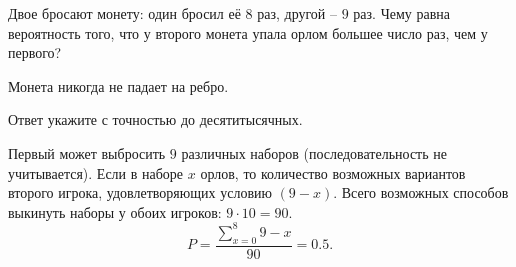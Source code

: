 
Двое бросают монету: один бросил её $8$ раз, другой – $9$ раз. Чему равна вероятность того, что у второго монета упала орлом большее число раз, чем у первого?

Монета никогда не падает на ребро.

Ответ укажите с точностью до десятитысячных.

\soultionSection

Первый может выбросить $9$ различных наборов (последовательность не учитывается). Если в наборе $x$ орлов, то количество возможных вариантов второго игрока, удовлетворяющих условию $(9 - x)$. Всего возможных способов выкинуть наборы у обоих игроков: $9 \cdot 10 = 90$. $$P = \frac{\sum\limits_{x=0}^8{9-x}}{90}=0.5.$$

